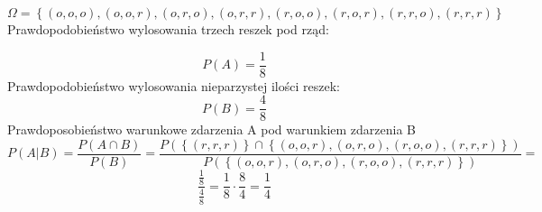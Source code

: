 \documentclass{article}
\begin{document}
\[ \Omega =\left \{(o,o,o),(o,o,r),(o,r,o),(o,r,r),(r,o,o),(r,o,r),(r,r,o),(r,r,r) \right \} \] 
Prawdopodobieństwo wylosowania trzech reszek pod rząd:

\[ P\left(A\right)= \frac{1}{8} \] 
Prawdopodobieństwo wylosowania nieparzystej ilości reszek:
\[ P\left(B\right)= \frac{4}{8} \] 
Prawdoposobieństwo warunkowe zdarzenia A pod warunkiem zdarzenia B
\[P\left(A|B\right) = \frac{P\left(A \cap B\right)}{P\left( B\right)} = \frac{ P \left(\left \{(r,r,r) \right \} \cap \left \{(o,o,r),(o,r,o),(r,o,o),(r,r,r) \right \}\right)}{ P \left( \left \{(o,o,r),(o,r,o),(r,o,o),(r,r,r) \right \}\right)} = \] 
\[  \frac{\frac{1}{8}}{\frac{4}{8}} = \frac{1}{8} \cdot \frac{8}{4} = \frac{1}{4} \] 

 
\end{document}
